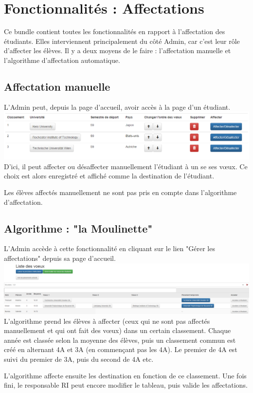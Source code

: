 \chapter{Fonctionnalités : Affectations}

Ce bundle contient toutes les fonctionnalités en rapport à l'affectation des étudiants.
Elles interviennent principalement du côté Admin, car c'est leur rôle d'affecter les élèves. Il y a deux moyens de le faire : l'affectation manuelle et l'algorithme d'affectation automatique.

\section{Affectation manuelle}

L'Admin peut, depuis la page d'accueil, avoir accès à la page d'un étudiant. 
 \bigbreak
 \includegraphics[scale=0.5]{images/voeux_etud_vupar_admin.PNG}
\bigbreak
D'ici, il peut affecter ou désaffecter manuellement l'étudiant à un se ses vœux.
Ce choix est alors enregistré et affiché comme la destination de l'étudiant.

Les élèves affectés manuellement ne sont pas pris en compte dans l'algorithme d'affectation.

\section{Algorithme : "la Moulinette"}

L'Admin accède à cette fonctionnalité en cliquant sur le lien "Gérer les affectations" depuis sa page d'accueil.
\bigbreak
\includegraphics[scale=0.22]{images/Liste_de_voeux_admin.PNG}
\bigbreak
L'algorithme prend les élèves à affecter (ceux qui ne sont pas affectés manuellement et qui ont fait des vœux) dans un certain classement. Chaque année est classée selon la moyenne des élèves, puis un classement commun est créé en alternant 4A et 3A (en commençant pas les 4A). Le premier de 4A est suivi du premier de 3A, puis du second de 4A etc.

L'algorithme affecte ensuite les destination en fonction de ce classement.
Une fois fini, le responsable RI peut encore modifier le tableau, puis valide les affectations.

